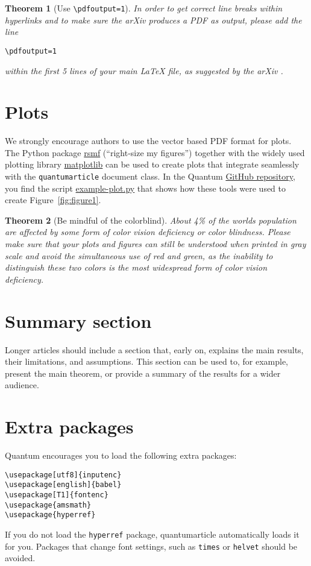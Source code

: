 \documentclass[a4paper,twocolumn,11pt,accepted=2017-05-09]{quantumarticle}
\newtheorem{theorem}{Theorem}
\begin{document}
\begin{theorem}[Use \texttt{\textbackslash pdfoutput=1}]
  In order to get correct line breaks within hyperlinks and to make sure the arXiv produces a PDF as output, please add the line
\begin{verbatim}
\pdfoutput=1
\end{verbatim}
  within the first 5 lines of your main LaTeX file, as suggested by the arXiv \cite{arxivpdfoutput}.
\end{theorem}

\section{Plots}
\label{sec:plots}
We strongly encourage authors to use the vector based PDF format for plots. The Python package \href{https://pypi.org/project/rsmf/}{rsmf} (``right-size my figures'') together with the widely used plotting library \href{https://matplotlib.org/}{matplotlib} can be used to create plots that integrate seamlessly with the \texttt{quantumarticle} document class. In the Quantum \href{https://github.com/quantum-journal/quantum-journal/}{GitHub repository}, you find the script \href{https://raw.githubusercontent.com/quantum-journal/quantum-journal/master/example-plot.py}{example-plot.py} that shows how these tools were used to create Figure~\ref{fig:figure1}.


\begin{theorem}[Be mindful of the colorblind]
  About 4\% of the worlds population are affected by some form of color vision deficiency or color blindness.
  Please make sure that your plots and figures can still be understood when printed in gray scale and avoid the simultaneous use of red and green, as the inability to distinguish these two colors is the most widespread form of color vision deficiency.
\end{theorem}

\section{Summary section}
Longer articles should include a section that, early on, explains the main results, their limitations, and assumptions.
This section can be used to, for example, present the main theorem, or provide a summary of the results for a wider audience.

\section{Extra packages}
Quantum encourages you to load the following extra packages:
\begin{verbatim}
\usepackage[utf8]{inputenc}
\usepackage[english]{babel}
\usepackage[T1]{fontenc}
\usepackage{amsmath}
\usepackage{hyperref}
\end{verbatim}
If you do not load the \texttt{hyperref} package, quantumarticle automatically loads it for you.
Packages that change font settings, such as \texttt{times} or \texttt{helvet} should be avoided.
\end{document}
